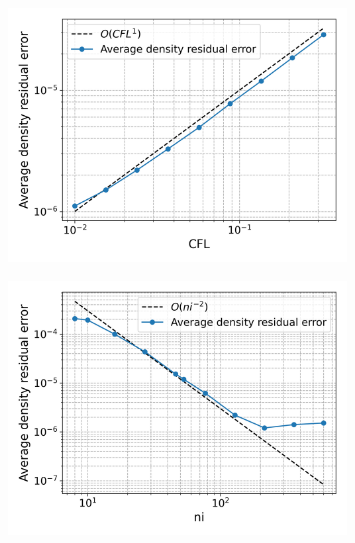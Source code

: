 \documentclass{article}
\begin{document}
\begin{figure}
    \centering
    \includegraphics[width=0.8\textwidth]{figures/bump_d_avg_cfl.png}
    \caption{}
    \label{fig:bump_d_avg_cfl}
\end{figure}

\begin{figure}
    \centering
    \includegraphics[width=0.8\textwidth]{figures/bump_d_avg_ni.png}
    \caption{}
    \label{fig:bump_d_avg_ni}
\end{figure}
\end{document}
